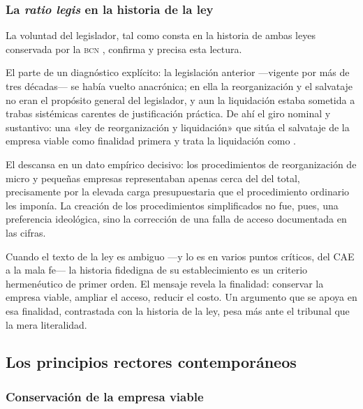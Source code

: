 \subsubsection{La \emph{ratio legis} en la historia de la ley}

La voluntad del legislador, tal como consta en la historia de ambas leyes conservada por la
\textsc{bcn} \parencite{historia-ley-20720, historia-ley-21563}, confirma y precisa esta lectura.

El  parte de un diagnóstico explícito: la legislación
anterior ---vigente por más de tres décadas--- se había vuelto anacrónica; en ella la
reorganización y el salvataje no eran el propósito general del legislador, y aun la liquidación
estaba sometida a trabas sistémicas carentes de justificación práctica. De ahí el giro nominal y
sustantivo: una «ley de reorganización y liquidación» que sitúa el salvataje de la empresa viable
como finalidad primera y trata la liquidación como .

El  descansa en un dato empírico decisivo: los procedimientos
de reorganización de micro y pequeñas empresas representaban apenas cerca del 
del total, precisamente por la elevada carga presupuestaria que el procedimiento ordinario les
imponía. La creación de los procedimientos simplificados no fue, pues, una preferencia
ideológica, sino la corrección de una falla de acceso documentada en las cifras.

\begin{foco}
Cuando el texto de la ley es ambiguo ---y lo es en varios puntos críticos, del CAE a la mala
fe--- la historia fidedigna de su establecimiento es un criterio hermenéutico de primer orden. El
mensaje revela la finalidad: conservar la empresa viable, ampliar el acceso, reducir el costo. Un
argumento que se apoya en esa finalidad, contrastada con la historia de la ley, pesa más ante el
tribunal que la mera literalidad.
\end{foco}

\subsection{Los principios rectores contemporáneos}

\subsubsection{Conservación de la empresa viable}

